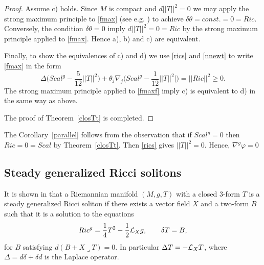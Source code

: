 \documentclass[10pt,british]{article}
\def\d{\delta}
\def\sb {{\nabla}}
\def\LC{{\nabla^g}}
\def\p{{\varphi}}
\begin{document}
\begin{proof}
Assume c) holds. Since $M$ is compact and $d||T||^2=0$ we may apply  the strong maximum principle to \eqref{fmax} (see e.g. \cite{YB,GFS}) to achieve $\delta\theta=const.=0=Ric$. Conversely, the condition $\delta\theta=0$ imply $d||T||^2=0=Ric$ by the strong maximum principle applied to \eqref{fmax}. Hence a),  b) and c) are equivalent.



Finally, to show the equivalences of c) and d) we use \eqref{rics} and \eqref{nnewt} to  write \eqref{fmax} in the form
\begin{equation}\label{fmaxf}
\Delta\Big(Scal^g-\frac5{12}||T||^2 \Big)+\theta_j\sb_j\Big( Scal^g-\frac1{12}||T||^2|\Big)=||Ric||^2\ge 0.
\end{equation}
The strong maximum principle applied to \eqref{fmaxf} imply c) is equivalent to d) in the same way as above.

The proof of Theorem~\ref{closTt} is completed.
\end{proof}
The Corollary~\ref{parallel} follows from  the observation  that if $Scal^g=0$ then $Ric=0=Scal$ by Theorem~\ref{closTt}. Then \eqref{rics} gives $||T||^2=0$. Hence, $\LC\p=0$


\subsection{Steady generalized  Ricci solitons}
It is shown in \cite[Proposition~4.28]{GFS} that a Riemannian manifold $(M,g,T)$ with a closed 3-form $T$  is a  steady generalized  Ricci soliton %
if there exists a vector field $X$ and a two-form $B$ such that it is a solution to the equations 
\begin{equation}\label{gein3}
Ric^g=\frac14T^2-\frac12{\cal{L}}_X g, \qquad \delta T=B,
\end{equation}
for $ B$ satisfying $d(B+X\lrcorner T)=0.$
In particular $\Delta T=-{\cal{L}}_XT$, where $\Delta=d\d+\d d$ is the Laplace operator.
\end{document}
